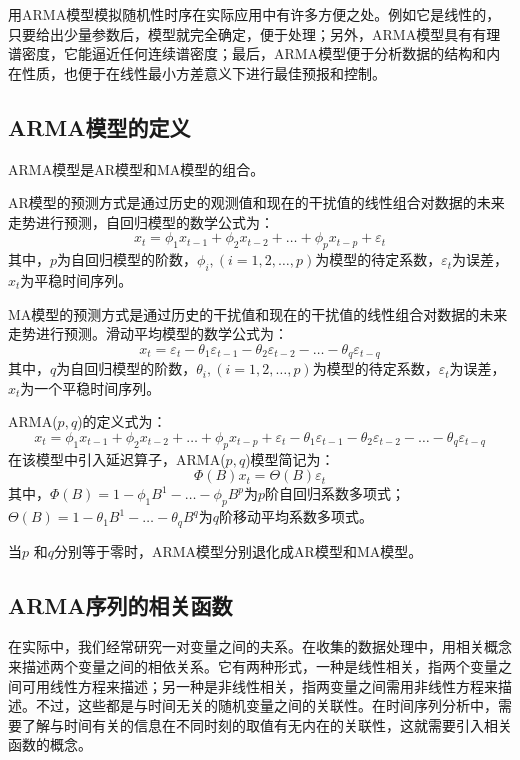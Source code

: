 用ARMA模型模拟随机性时序在实际应用中有许多方便之处。例如它是线性的，只要给出少量参数后，模型就完全确定，便于处理；另外，ARMA模型具有有理谱密度，它能逼近任何连续谱密度；最后，ARMA模型便于分析数据的结构和内在性质，也便于在线性最小方差意义下进行最佳预报和控制。

\subsection{ARMA模型的定义}
ARMA模型是AR模型和MA模型的组合。

AR模型的预测方式是通过历史的观测值和现在的干扰值的线性组合对数据的未来走势进行预测，自回归模型的数学公式为：
\begin{equation}
\label{equ:xtAR}
	x_t = \phi_{1}x_{t-1} + \phi_{2}x_{t-2} + \dots +\phi_{p}x_{t-p} +\varepsilon_t
\end{equation}
其中，$p$为自回归模型的阶数，$\phi_{i},(i=1,2,\dots,p)$为模型的待定系数，$\varepsilon_t$为误差，$x_t$为平稳时间序列。

MA模型的预测方式是通过历史的干扰值和现在的干扰值的线性组合对数据的未来走势进行预测。滑动平均模型的数学公式为：
\begin{equation}
	x_t = \varepsilon_t - \theta_{1}\varepsilon_{t-1} - \theta_{2}\varepsilon_{t-2} - \dots - \theta_{q}\varepsilon_{t-q} 
\end{equation}
其中，$q$为自回归模型的阶数，$\theta_{i},(i=1,2,\dots,p)$为模型的待定系数，$\varepsilon_t$为误差，$x_t$为一个平稳时间序列。

ARMA($p,q$)的定义式为：
\begin{equation}
	 x_t = \phi_{1}x_{t-1} + \phi_{2}x_{t-2} + \dots +\phi_{p}x_{t-p} +\varepsilon_t - \theta_{1}\varepsilon_{t-1} - \theta_{2}\varepsilon_{t-2} - \dots - \theta_{q}\varepsilon_{t-q} 
\end{equation}
在该模型中引入延迟算子，ARMA($p,q$)模型简记为：
\begin{equation}
	\Phi(B)x_t = \Theta(B)\varepsilon_t
\end{equation}
其中，$ \Phi(B) = 1 - \phi_{1}B^1 - \dots - \phi_{p}B^p$为$p$阶自回归系数多项式；$ \Theta(B) = 1 - \theta_{1}B^1 - \dots - \theta_{q}B^q$为$q$阶移动平均系数多项式。

当$p$ 和$q$分别等于零时，ARMA模型分别退化成AR模型和MA模型。

\subsection{ARMA序列的相关函数}
在实际中，我们经常研究一对变量之间的夫系。在收集的数据处理中，用相关概念来描述两个变量之间的相依关系。它有两种形式，一种是线性相关，指两个变量之间可用线性方程来描述；另一种是非线性相关，指两变量之间需用非线性方程来描述。不过，这些都是与时间无关的随机变量之间的关联性。在时间序列分析中，需要了解与时间有关的信息在不同时刻的取值有无内在的关联性，这就需要引入相关函数的概念。

